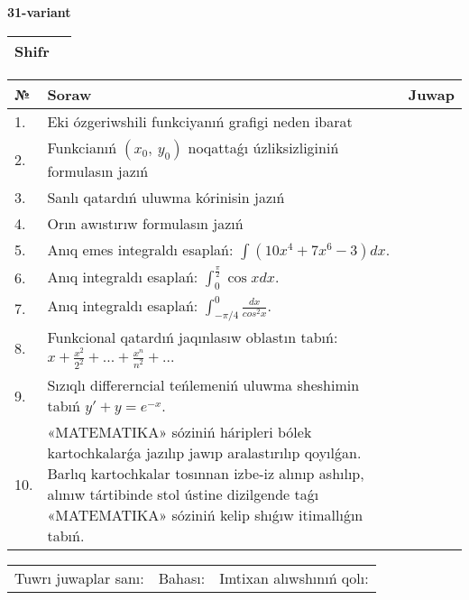 \documentclass{article}
\begin{document}
  \egroup
  
  \newpage
  
  
  \textbf{31-variant}\\
  
  \bgroup
  \def\arraystretch{1.6} %
  
  \begin{tabular}{|m{5.7cm}|m{9.5cm}|}
  \hline
  Shifr & \\
  \hline
  \end{tabular}
  
  \vspace{1cm}
  
  \begin{tabular}{|m{0.7cm}|m{10cm}|m{4cm}|}
  \hline
  № & Soraw & Juwap \\
  \hline
  1. & Eki ózgeriwshili funkciyanıń grafigi neden ibarat &  \\
  \hline
  2. & Funkcianıń \((x_{0},\ y_{0})\) noqattaǵı úzliksizliginiń formulasın jazıń &  \\
  \hline
  3. & Sanlı qatardıń uluwma kórinisin jazıń &  \\
  \hline
  4. & Orın awıstırıw formulasın jazıń &  \\
  \hline
  5. & Anıq emes integraldı esaplań: \(\int{\left( 10x^{4} + 7x^{6} - 3 \right)dx}\). &  \\
  \hline
  6. & Anıq integraldı esaplań: \(\int_{0}^{\frac{\pi}{2}}{\cos xdx}\). &  \\
  \hline
  7. & Anıq integraldı esaplań: \(\int_{- \pi/4}^{0}\frac{dx}{cos^2 x}\). &  \\
  \hline
  8. & Funkcional qatardıń jaqınlasıw oblastın tabıń: \(x + \frac{x^2 }{2^2 } + ... + \frac{x^{n}}{n^2 } + ...\) &  \\
  \hline
  9. & Sızıqlı differerncial teńlemeniń uluwma sheshimin tabıń \(y' + y = e^{- x}\). &  \\
  \hline
  10. & «MATEMATIKA» sóziniń háripleri bólek kartochkalarǵa jazılıp jawıp aralastırılıp qoyılǵan. Barlıq kartochkalar tosınnan izbe-iz alınıp ashılıp, alınıw tártibinde stol ústine dizilgende taǵı «MATEMATIKA» sóziniń kelip shıǵıw itimallıǵın tabıń. &  \\
  \hline
  \end{tabular}
  
  \vspace{1cm}
  
  \begin{tabular}{lll}
  Tuwrı juwaplar sanı: \underline{\hspace{1.5cm}} & 
  Bahası: \underline{\hspace{1.5cm}} & 
  Imtixan alıwshınıń qolı: \underline{\hspace{2cm}} \\
  \end{tabular}
  
\end{document}
